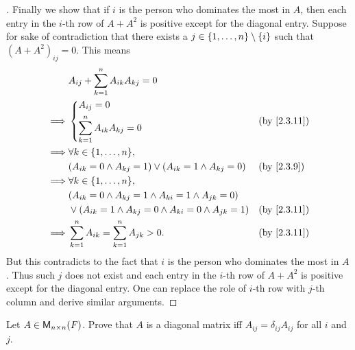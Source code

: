 \begin{proof}[]
	Finally we show that if \(i\) is the person who dominates the most in \(A\), then each entry in the \(i\)-th row of \(A + A^2\) is positive except for the diagonal entry.
	Suppose for sake of contradiction that there exists a \(j \in \left\lbrace1, \dots, n\right\rbrace \setminus \left\lbrace i\right\rbrace\) such that \((A + A^2)_{i j} = 0\).
	This means
	\begin{align*}
		         & A_{i j} + \sum_{k = 1}^n A_{i k} A_{k j} = 0                                              \\
		\implies & \begin{dcases}
			           A_{i j} = 0 \\
			           \sum_{k = 1}^n A_{i k} A_{k j} = 0
		           \end{dcases}                                       &  & \by{2.3.11}                       \\
		\implies & \forall k \in \set{1, \dots, n},                                                          \\
		         & (A_{i k} = 0 \land A_{k j} = 1) \lor (A_{i k} = 1 \land A_{k j} = 0)     &  & \by{2.3.9}  \\
		\implies & \forall k \in \set{1, \dots, n},                                                          \\
		         & (A_{i k} = 0 \land A_{k j} = 1 \land A_{k i} = 1 \land A_{j k} = 0)                       \\
		         & \lor (A_{i k} = 1 \land A_{k j} = 0 \land A_{k i} = 0 \land A_{j k} = 1) &  & \by{2.3.11} \\
		\implies & \sum_{k = 1}^n A_{i k} = \sum_{k = 1}^n A_{j k} > 0.                     &  & \by{2.3.11}
	\end{align*}
	But this contradicts to the fact that \(i\) is the person who dominates the most in \(A\).
	Thus such \(j\) does not exist and each entry in the \(i\)-th row of \(A + A^2\) is positive except for the diagonal entry.
	One can replace the role of \(i\)-th row with \(j\)-th column and derive similar arguments.
\end{proof}

\exercisesection

\setcounter{ex}{9}
\begin{ex}\label{ex:2.3.10}
	Let \(A \in \mathsf{M}_{{n} \times n}({\mathit{F}})\).
	Prove that \(A\) is a diagonal matrix iff \(A_{i j} = \delta_{i j} A_{i j}\) for all \(i\) and \(j\).
\end{ex}

